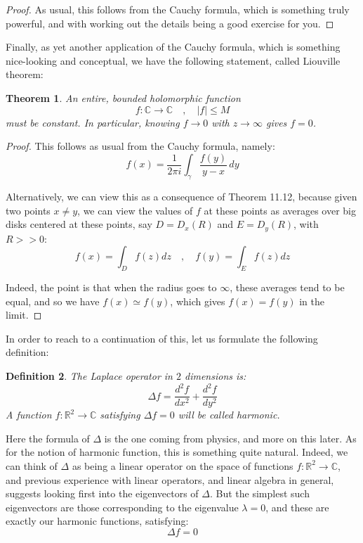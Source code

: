 \documentclass[12pt]{amsbook}
\newtheorem{theorem}{Theorem}[chapter]
\newtheorem{definition}[theorem]{Definition}
\begin{document}
\begin{proof}
As usual, this follows from the Cauchy formula, which is something truly powerful, and with working out the details being a good exercise for you.
\end{proof}

Finally, as yet another application of the Cauchy formula, which is something nice-looking and conceptual, we have the following statement, called Liouville theorem:


\begin{theorem}
An entire, bounded holomorphic function
$$f:\mathbb C\to\mathbb C\quad,\quad |f|\leq M$$
must be constant. In particular, knowing $f\to0$ with $z\to\infty$ gives $f=0$.
\end{theorem}

\begin{proof}
This follows as usual from the Cauchy formula, namely:
$$f(x)=\frac{1}{2\pi i}\int_\gamma\frac{f(y)}{y-x}\,dy$$

Alternatively, we can view this as a consequence of Theorem 11.12, because given two points $x\neq y$, we can view the values of $f$ at these points as averages over big disks centered at these points, say $D=D_x(R)$ and $E=D_y(R)$, with $R>>0$:
$$f(x)=\int_Df(z)dz\quad,\quad f(y)=\int_Ef(z)dz$$

Indeed, the point is that when the radius goes to $\infty$, these averages tend to be equal, and so we have $f(x)\simeq f(y)$, which gives $f(x)=f(y)$ in the limit.
\end{proof}

In order to reach to a continuation of this, let us formulate the following definition:


\begin{definition}
The Laplace operator in $2$ dimensions is:
$$\Delta f=\frac{d^2f}{dx^2}+\frac{d^2f}{dy^2}$$
A function $f:\mathbb R^2\to\mathbb C$ satisfying $\Delta f=0$ will be called harmonic.
\end{definition}

Here the formula of $\Delta$ is the one coming from physics, and more on this later. As for the notion of harmonic function, this is something quite natural. Indeed, we can think of $\Delta$ as being a linear operator on the space of functions $f:\mathbb R^2\to\mathbb C$, and previous experience with linear operators, and linear algebra in general, suggests looking first into the eigenvectors of $\Delta$. But the simplest such eigenvectors are those corresponding to the eigenvalue $\lambda=0$, and these are exactly our harmonic functions, satisfying:
$$\Delta f=0$$
\end{document}

